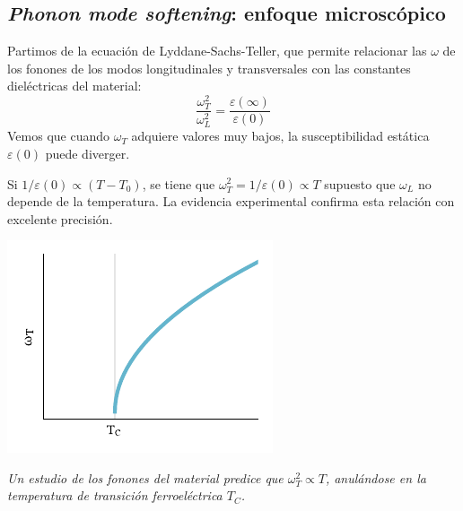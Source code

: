 \documentclass{tufte-book}
\newcommand{\sub}[1]{_{{\scriptscriptstyle\mathit{#1}}}}
\begin{document}
\subsection{\textit{Phonon mode softening}: enfoque microscópico}

Partimos de la ecuación de Lyddane-Sachs-Teller, que permite
relacionar las $ω$ de los fonones de los modos longitudinales y
transversales con las constantes dieléctricas del material:
\begin{equation}
  \frac{ω\sub{T}^2}{ω\sub{L}^2} = \frac{ε(∞)}{ε(0)}
\end{equation}
Vemos que cuando $ω\sub{T}$ adquiere valores muy bajos, la
susceptibilidad estática $ε(0)$ puede diverger.

Si $1/ε(0) ∝ (T-T_0)$, se tiene que $ω^2\sub{T} = 1/ε(0) ∝ T$ supuesto
que $ω\sub{L}$ no depende de la temperatura. La
evidencia experimental confirma esta relación con excelente precisión.

\begin{marginfigure}
  \centering
  \includegraphics{figures/softphonon.pdf}
  \caption{\itshape Un estudio de los fonones del material predice que
    $ω\sub{T}^2 ∝ T$, anulándose en la temperatura de transición
    ferroeléctrica $T\sub{C}$.}
  \label{fig:softphonon}
\end{marginfigure}






\end{document}
